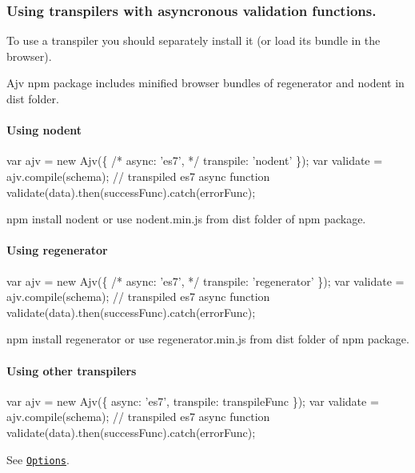 \subsubsection*{Using transpilers with asyncronous validation functions.}

To use a transpiler you should separately install it (or load its bundle in the browser).

Ajv npm package includes minified browser bundles of regenerator and nodent in dist folder.

\paragraph*{Using nodent}


\begin{DoxyCode}
var ajv = new Ajv(\{ /* async: 'es7', */ transpile: 'nodent' \});
var validate = ajv.compile(schema); // transpiled es7 async function
validate(data).then(successFunc).catch(errorFunc);
\end{DoxyCode}


{\ttfamily npm install nodent} or use {\ttfamily nodent.\+min.\+js} from dist folder of npm package.

\paragraph*{Using regenerator}


\begin{DoxyCode}
var ajv = new Ajv(\{ /* async: 'es7', */ transpile: 'regenerator' \});
var validate = ajv.compile(schema); // transpiled es7 async function
validate(data).then(successFunc).catch(errorFunc);
\end{DoxyCode}


{\ttfamily npm install regenerator} or use {\ttfamily regenerator.\+min.\+js} from dist folder of npm package.

\paragraph*{Using other transpilers}


\begin{DoxyCode}
var ajv = new Ajv(\{ async: 'es7', transpile: transpileFunc \});
var validate = ajv.compile(schema); // transpiled es7 async function
validate(data).then(successFunc).catch(errorFunc);
\end{DoxyCode}


See \href{#options}{\tt Options}.

